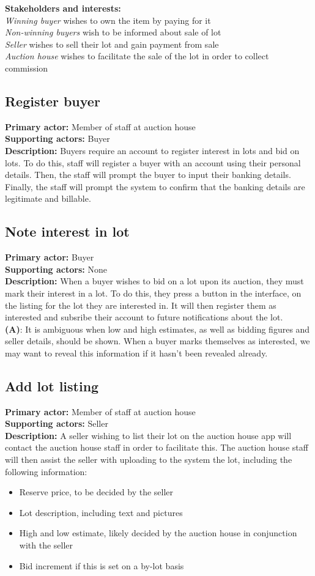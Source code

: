 \documentclass[titlepage, 12pt]{extarticle}
\begin{document}
{\bf Stakeholders and interests: }
\\{\em Winning buyer} wishes to own the item by paying for it
\\{\em Non-winning buyers} wish to be informed about sale of lot
\\{\em Seller} wishes to sell their lot and gain payment from sale
\\{\em Auction house} wishes to facilitate the sale of the lot in order to collect commission
\subsection{Register buyer}
{\bf Primary actor: } Member of staff at auction house
\\{\bf Supporting actors: } Buyer
\\{\bf Description: } Buyers require an account to register interest in lots and bid on lots. To do this, staff will register a buyer with an account using their personal details. Then, the staff will prompt the buyer to input their banking details. Finally, the staff will prompt the system to confirm that the banking details are legitimate and billable.
\subsection{Note interest in lot}
{\bf Primary actor: } Buyer
\\{\bf Supporting actors: } None
\\{\bf Description: } When a buyer wishes to bid on a lot upon its auction, they must mark their interest in a lot. To do this, they press a button in the interface, on the listing for the lot they are interested in. It will then register them as interested and subsribe their account to future notifications about the lot.
\\{\bf (A)}: It is ambiguous when low and high estimates, as well as bidding figures and seller details, should be shown. When a buyer marks themselves as interested, we may want to reveal this information if it hasn't been revealed already.
\subsection{Add lot listing}
{\bf Primary actor: } Member of staff at auction house
\\{\bf Supporting actors: } Seller
\\{\bf Description: } A seller wishing to list their lot on the auction house app will contact the auction house staff in order to facilitate this. The auction house staff will then assist the seller with uploading to the system the lot, including the following information:
\begin{itemize}
\item Reserve price, to be decided by the seller
\item Lot description, including text and pictures
\item High and low estimate, likely decided by the auction house in conjunction with the seller
\item Bid increment if this is set on a by-lot basis
\end{itemize}
\end{document}
